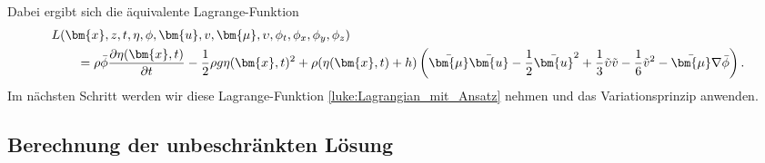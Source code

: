 Dabei ergibt sich die äquivalente Lagrange-Funktion
\begin{align}
&L(\bm{x},z,t,\eta,\phi,\bm{u}, v, \bm{\mu},\upsilon,\phi_t,\phi_x,\phi_y,\phi_z)
\notag
\\
&\qquad=
	\rho\bar{\phi}\frac{\partial \eta(\bm{x}, t)}{\partial t}
	-
	\frac{1}{2} \rho g \eta(\bm{x}, t)^2
	+
	\rho(\eta(\bm{x}, t) + h)
	\left(
	\bar{\bm{\mu}}\bar{\bm{u}}
	-
	\frac{1}{2} \bar{\bm{u}}^2 
	+
	\frac{1}{3} \tilde{\upsilon}\tilde{v}
	-
	\frac{1}{6}\tilde{v}^2
	-
	\bar{\bm{\mu}}\nabla \bar{\phi}
	\right).
	\label{luke:Lagrangian_mit_Ansatz}
\end{align}
Im nächsten Schritt werden wir diese Lagrange-Funktion \eqref{luke:Lagrangian_mit_Ansatz} nehmen und das Variationsprinzip anwenden.

\subsection{Berechnung der unbeschränkten Lösung}

